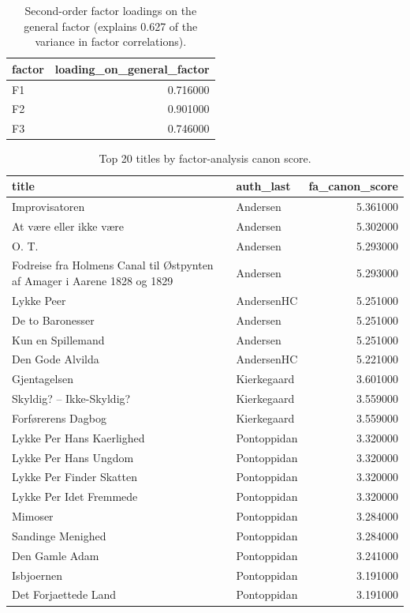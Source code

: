 \begin{table}
\caption{Second-order factor loadings on the general factor (explains 0.627 of the variance in factor correlations).}
\label{tab:full_second_order_loadings}
\begin{tabular}{lr}
\toprule
factor & loading\_on\_general\_factor \\
\midrule
F1 & 0.716000 \\
F2 & 0.901000 \\
F3 & 0.746000 \\
\bottomrule
\end{tabular}
\end{table}


\begin{table}
\caption{Top 20 titles by factor-analysis canon score.}
\label{tab:full_fa_canon_score_top20}
\begin{tabular}{llr}
\toprule
title & auth\_last & fa\_canon\_score \\
\midrule
Improvisatoren  & Andersen & 5.361000 \\
At være eller ikke være & Andersen & 5.302000 \\
O. T.  & Andersen & 5.293000 \\
Fodreise fra Holmens Canal til Østpynten af Amager i Aarene 1828 og 1829 & Andersen & 5.293000 \\
Lykke Peer & AndersenHC & 5.251000 \\
De to Baronesser & Andersen & 5.251000 \\
Kun en Spillemand  & Andersen & 5.251000 \\
Den Gode Alvilda & AndersenHC & 5.221000 \\
Gjentagelsen & Kierkegaard & 3.601000 \\
Skyldig? – Ikke-Skyldig? & Kierkegaard & 3.559000 \\
Forførerens Dagbog  & Kierkegaard & 3.559000 \\
Lykke Per Hans Kaerlighed & Pontoppidan & 3.320000 \\
Lykke Per Hans Ungdom & Pontoppidan & 3.320000 \\
Lykke Per Finder Skatten & Pontoppidan & 3.320000 \\
Lykke Per Idet Fremmede & Pontoppidan & 3.320000 \\
Mimoser & Pontoppidan & 3.284000 \\
Sandinge Menighed & Pontoppidan & 3.284000 \\
Den Gamle Adam & Pontoppidan & 3.241000 \\
Isbjoernen & Pontoppidan & 3.191000 \\
Det Forjaettede Land & Pontoppidan & 3.191000 \\
\bottomrule
\end{tabular}
\end{table}



